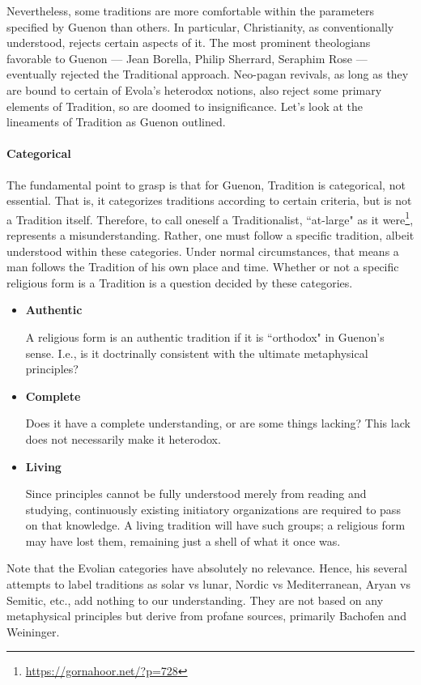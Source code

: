 Nevertheless, some traditions are more comfortable within the parameters specified by Guenon than others. In particular, Christianity, as conventionally understood, rejects certain aspects of it. The most prominent theologians favorable to Guenon — Jean Borella, Philip Sherrard, Seraphim Rose — eventually rejected the Traditional approach. Neo-pagan revivals, as long as they are bound to certain of Evola's heterodox notions, also reject some primary elements of Tradition, so are doomed to insignificance. Let's look at the lineaments of Tradition as Guenon outlined.

\paragraph{Categorical}
The fundamental point to grasp is that for Guenon, Tradition is categorical, not essential. That is, it categorizes traditions according to certain criteria, but is not a Tradition itself. Therefore, to call oneself a Traditionalist, ``at-large" as it were\footnote{\url{https://gornahoor.net/?p=728}}, represents a misunderstanding. Rather, one must follow a specific tradition, albeit understood within these categories. Under normal circumstances, that means a man follows the Tradition of his own place and time. Whether or not a specific religious form is a Tradition is a question decided by these categories.

\begin{itemize}
\item \textbf{Authentic}

A religious form is an authentic tradition if it is ``orthodox" in Guenon's sense. I.e., is it doctrinally consistent with the ultimate metaphysical principles? 
\item \textbf{Complete}

Does it have a complete understanding, or are some things lacking? This lack does not necessarily make it heterodox. 
\item \textbf{Living}

Since principles cannot be fully understood merely from reading and studying, continuously existing initiatory organizations are required to pass on that knowledge. A living tradition will have such groups; a religious form may have lost them, remaining just a shell of what it once was. 
\end{itemize}
Note that the Evolian categories have absolutely no relevance. Hence, his several attempts to label traditions as solar vs lunar, Nordic vs Mediterranean, Aryan vs Semitic, etc., add nothing to our understanding. They are not based on any metaphysical principles but derive from profane sources, primarily Bachofen and Weininger.

